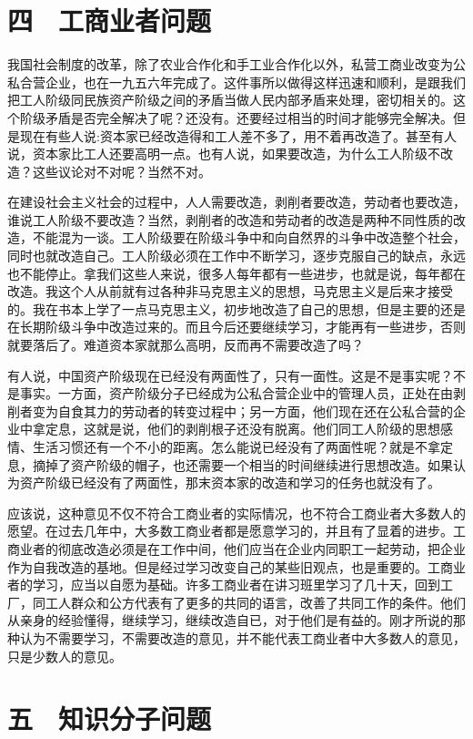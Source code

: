 \section{四　工商业者问题}

我国社会制度的改革，除了农业合作化和手工业合作化以外，私营工商业改变为公私合营企业，也在一九五六年完成了。这件事所以做得这样迅速和顺利，是跟我们把工人阶级同民族资产阶级之间的矛盾当做人民内部矛盾来处理，密切相关的。这个阶级矛盾是否完全解决了呢？还没有。还要经过相当的时间才能够完全解决。但是现在有些人说:资本家已经改造得和工人差不多了，用不着再改造了。甚至有人说，资本家比工人还要高明一点。也有人说，如果要改造，为什么工人阶级不改造？这些议论对不对呢？当然不对。

在建设社会主义社会的过程中，人人需要改造，剥削者要改造，劳动者也要改造，谁说工人阶级不要改造？当然，剥削者的改造和劳动者的改造是两种不同性质的改造，不能混为一谈。工人阶级要在阶级斗争中和向自然界的斗争中改造整个社会，同时也就改造自己。工人阶级必须在工作中不断学习，逐步克服自己的缺点，永远也不能停止。拿我们这些人来说，很多人每年都有一些进步，也就是说，每年都在改造。我这个人从前就有过各种非马克思主义的思想，马克思主义是后来才接受的。我在书本上学了一点马克思主义，初步地改造了自己的思想，但是主要的还是在长期阶级斗争中改造过来的。而且今后还要继续学习，才能再有一些进步，否则就要落后了。难道资本家就那么高明，反而再不需要改造了吗？

有人说，中国资产阶级现在已经没有两面性了，只有一面性。这是不是事实呢？不是事实。一方面，资产阶级分子已经成为公私合营企业中的管理人员，正处在由剥削者变为自食其力的劳动者的转变过程中；另一方面，他们现在还在公私合营的企业中拿定息，这就是说，他们的剥削根子还没有脱离。他们同工人阶级的思想感情、生活习惯还有一个不小的距离。怎么能说已经没有了两面性呢？就是不拿定息，摘掉了资产阶级的帽子，也还需要一个相当的时间继续进行思想改造。如果认为资产阶级已经没有了两面性，那末资本家的改造和学习的任务也就没有了。

应该说，这种意见不仅不符合工商业者的实际情况，也不符合工商业者大多数人的愿望。在过去几年中，大多数工商业者都是愿意学习的，并且有了显着的进步。工商业者的彻底改造必须是在工作中间，他们应当在企业内同职工一起劳动，把企业作为自我改造的基地。但是经过学习改变自己的某些旧观点，也是重要的。工商业者的学习，应当以自愿为基础。许多工商业者在讲习班里学习了几十天，回到工厂，同工人群众和公方代表有了更多的共同的语言，改善了共同工作的条件。他们从亲身的经验懂得，继续学习，继续改造自已，对于他们是有益的。刚才所说的那种认为不需要学习，不需要改造的意见，并不能代表工商业者中大多数人的意见，只是少数人的意见。

\section{五　知识分子问题}

